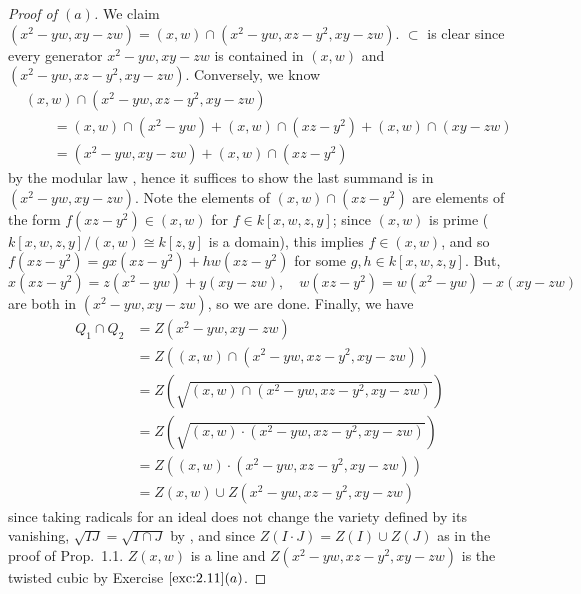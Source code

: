 \documentclass[12pt,letterpaper]{article}
\theoremstyle{definition}
\theoremstyle{remark}
\numberwithin{equation}{section}
\numberwithin{figure}{problem}
\newcommand{\PP}{\mathbb{P}}
\begin{document}
\begin{proof}[Proof of $(a)$]
  We claim $(x^2-yw,xy-zw) = (x,w) \cap (x^2-yw,xz-y^2,xy-zw)$. $\subset$ is
  clear since every generator $x^2-yw,xy-zw$ is contained in $(x,w)$ and
  $(x^2-yw,xz-y^2,xy-zw)$. Conversely, we know
  \begin{align*}
    &(x,w) \cap (x^2-yw,xz-y^2,xy-zw)\\
    &\qquad= (x,w) \cap (x^2 - yw) + (x,w) \cap (xz - y^2) + (x,w) \cap (xy-zw)\\
    &\qquad= (x^2-yw,xy-zw) + (x,w) \cap (xz - y^2)
  \end{align*}
  by the modular law \cite[p.~6]{AM69}, hence it suffices to show the last
  summand is in $(x^2-yw,xy-zw)$. Note the elements of $(x,w) \cap (xz - y^2)$
  are elements of the form $f(xz - y^2) \in (x,w)$ for $f \in
  k[x,w,z,y]$; since $(x,w)$ is prime ($k[x,w,z,y]/(x,w) \cong k[z,y]$ is a
  domain), this implies $f \in (x,w)$, and so $f
  (xz - y^2) = gx(xz - y^2) + hw(xz - y^2)$ for some $g,h \in k[x,w,z,y]$. But,
  \begin{equation*}
    x(xz-y^2) = z(x^2 - yw) + y(xy - zw), \quad
    w(xz - y^2) = w(x^2 - yw) - x(xy - zw)
  \end{equation*}
  are both in $(x^2-yw,xy-zw)$, so we are done. Finally, we have
  \begin{align*}
    Q_1 \cap Q_2 &= Z(x^2-yw,xy-zw)\\
    &= Z((x,w) \cap (x^2-yw,xz-y^2,xy-zw))\\
    &= Z(\sqrt{(x,w) \cap (x^2-yw,xz-y^2,xy-zw)})\\
    &= Z(\sqrt{(x,w) \cdot (x^2-yw,xz-y^2,xy-zw)})\\
    &= Z((x,w) \cdot (x^2-yw,xz-y^2,xy-zw))\\
    &= Z(x,w) \cup Z(x^2-yw,xz-y^2,xy-zw)
  \end{align*}
  since taking radicals for an ideal does not change the variety defined by its
  vanishing, $\sqrt{IJ} = \sqrt{I \cap J}$ by \cite[Exc.~1.13$iii$]{AM69}, and
  since $Z(I \cdot J) = Z(I) \cup Z(J)$ as in the proof of Prop.~1.1. $Z(x,w)$
  is a line and $Z(x^2-yw,xz-y^2,xy-zw)$ is the twisted cubic by 
  Exercise $\ref{exc:2.11}(a)$.
\end{proof}
\end{document}
